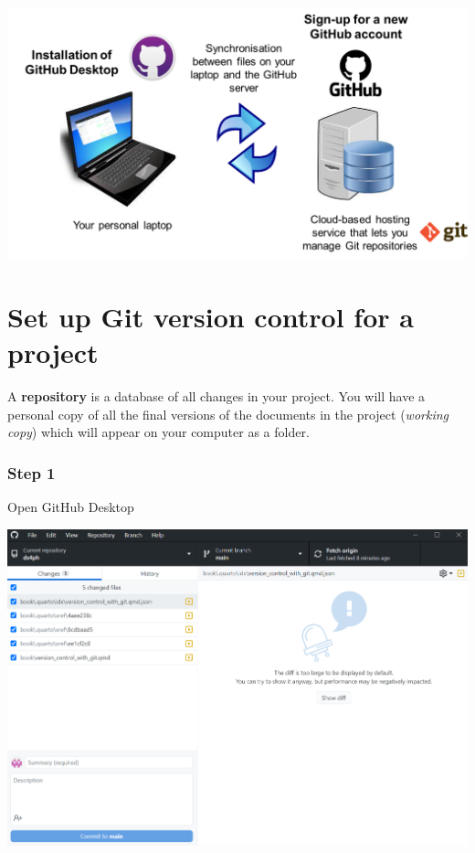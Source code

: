 \documentclass[
  letterpaper,
  DIV=11,
  numbers=noendperiod]{scrreprt}
\begin{document}
\includegraphics{./images/paste-081F7F03.png}

\hypertarget{set-up-git-version-control-for-a-project}{%
\section{Set up Git version control for a
project}\label{set-up-git-version-control-for-a-project}}

\begin{tcolorbox}[enhanced jigsaw, colframe=quarto-callout-note-color-frame, colback=white, rightrule=.15mm, bottomrule=.15mm, left=2mm, arc=.35mm, coltitle=black, title=\textcolor{quarto-callout-note-color}{\faInfo}\hspace{0.5em}{Note}, opacitybacktitle=0.6, bottomtitle=1mm, opacityback=0, toptitle=1mm, toprule=.15mm, colbacktitle=quarto-callout-note-color!10!white, titlerule=0mm, leftrule=.75mm, breakable]
A \textbf{repository} is a database of all changes in your project. You
will have a personal copy of all the final versions of the documents in
the project (\emph{working copy}) which will appear on your computer as
a folder.
\end{tcolorbox}

\hypertarget{step-1}{%
\subsubsection{Step 1}\label{step-1}}

Open GitHub Desktop

\includegraphics{./images/paste-EFF40D72.png}
\end{document}
